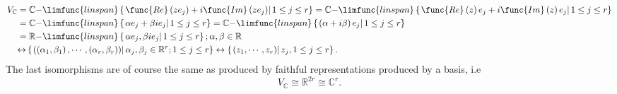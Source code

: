 \documentclass[aps,preprint]{revtex4}
\begin{document}
\begin{align}
V_{\mathbb{C}} & =\mathbb{C-}\limfunc{linspan}\left\{ \left. \func{Re}\left(
ze_{j}\right) +i\func{Im}\left( ze_{j}\right) \right\vert 1\leq j\leq
r\right\} =\mathbb{C-}\limfunc{linspan}\left\{ \left. \func{Re}\left(
z\right) e_{j}+i\func{Im}\left( z\right) e_{j}\right\vert 1\leq j\leq
r\right\} \\
& =\mathbb{C-}\limfunc{linspan}\left\{ \left. \alpha e_{j}+\beta
ie_{j}\right\vert 1\leq j\leq r\right\} =\mathbb{C-}\limfunc{linspan}\left\{
\left. \left( \alpha+i\beta\right) e_{j}\right\vert 1\leq j\leq r\right\} \\
& =\mathbb{R-}\limfunc{linspan}\left\{ \left. \alpha e_{j},\beta
ie_{j}\right\vert 1\leq j\leq r\right\} ;\alpha,\beta\in\mathbb{R} \\
& \mathbb{\leftrightarrow}\left\{ \left. \left( \left(
\alpha_{1},\beta_{1}\right) ,\cdots,\left( \alpha_{r},\beta_{r}\right)
\right) \right\vert \alpha_{j},\beta_{j}\in\mathbb{R}^{r};1\leq j\leq
r\right\} \leftrightarrow\left\{ \left. \left( z_{1},\cdots,z_{r}\right)
\right\vert z_{j},1\leq j\leq r\right\} .
\end{align}
The last isomorphisms are of course the same as produced by faithful
representations produced by a basis, i.e 
\begin{equation}
V_{\mathbb{C}}\cong\mathbb{R}^{2r}\cong\mathbb{C}^{r}.
\end{equation}
\end{document}
